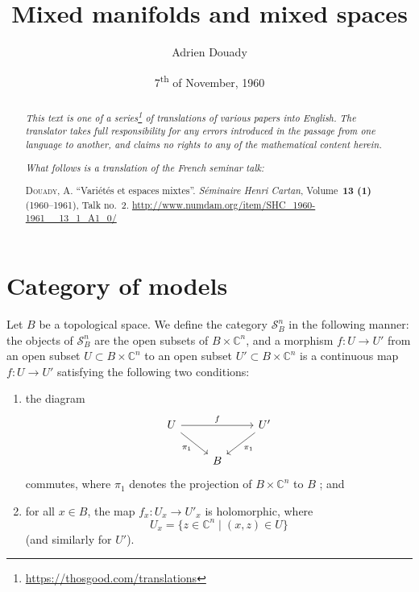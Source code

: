 \documentclass{article}
\title{Mixed manifolds and mixed spaces}
\author{Adrien Douady}
\date{7\textsuperscript{th} of November, 1960}
\theoremstyle{plain}
\theoremstyle{definition}
\newcommand{\CC}{\mathbb{C}}
\newcommand{\oldpage}[1]{\marginpar{\footnotesize$\Big\vert$ \textit{p.~#1}}}
\begin{document}
\maketitle
\thispagestyle{fancy}

\renewcommand{\abstractname}{Translator's note.}

\begin{abstract}
  \renewcommand*{\thefootnote}{\fnsymbol{footnote}}
  \emph{This text is one of a series\footnote{\url{https://thosgood.com/translations}} of translations of various papers into English.}
  \emph{The translator takes full responsibility for any errors introduced in the passage from one language to another, and claims no rights to any of the mathematical content herein.}

  \medskip
  
  \emph{What follows is a translation of the French seminar talk:}

  \medskip\noindent
  \textsc{Douady, A.}
  ``Vari\'{e}t\'{e}s et espaces mixtes''.
  \emph{S\'{e}minaire Henri Cartan}, Volume~\textbf{13 (1)} (1960--1961), Talk no.~2.
  {\url{http://www.numdam.org/item/SHC_1960-1961__13_1_A1_0/}}
\end{abstract}

\setcounter{footnote}{0}

\tableofcontents
\bigskip



\section{Category of models}
\label{I}

\oldpage{2-01}
Let $B$ be a topological space.
We define the category $\mathscr{S}_B^n$ in the following manner: the objects of $\mathscr{S}_B^n$ are the open subsets of $B\times\CC^n$, and a morphism $f\colon U\to U'$ from an open subset $U\subset B\times\CC^n$ to an open subset $U'\subset B\times\CC^n$ is a continuous map $f\colon U\to U'$ satisfying the following two conditions:
\begin{enumerate}
  \item the diagram
    \[
      \begin{tikzcd}
        U \ar[rr,"f"] \ar[dr,swap,"\pi_1"]
        && U' \ar[dl,"\pi_1"]
      \\&B&
      \end{tikzcd}
    \]
    commutes, where $\pi_1$ denotes the projection of $B\times\CC^n$ to $B$ ; and
  \item for all $x\in B$, the map $f_x\colon U_x\to U'_x$ is holomorphic, where
    \[
      U_x = \{z\in\CC^n \mid (x,z)\in U\}
    \]
    (and similarly for $U'$).
\end{enumerate}
\end{document}
